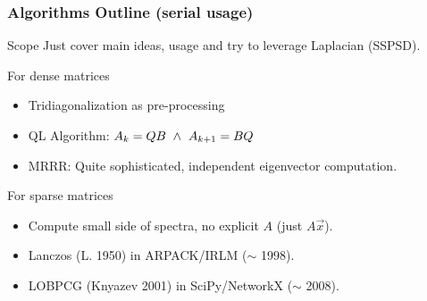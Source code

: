  \begin{frame}
  \frametitle{Algorithms Outline (serial usage)}
  \begin{block}{Scope}
    Just cover main ideas, usage and try to leverage Laplacian (SSPSD).
  \end{block}
  \begin{block}{For dense matrices}
    \begin{itemize}
      \item Tridiagonalization as pre-processing
      \item QL Algorithm: $A_k = QB \,\,\land\,\, A_{k+1} = B Q$
      \item MRRR: Quite sophisticated, independent eigenvector computation.
    \end{itemize}
  \end{block}
  \begin{block}{For sparse matrices}
    \begin{itemize}
      \item Compute small side of spectra, no explicit $A$ (just $A\vec{x}$).
    \item Lanczos (L. 1950) in ARPACK/IRLM ($\sim$ 1998).
    \item LOBPCG (Knyazev 2001) in SciPy/NetworkX ($\sim$ 2008).
    \end{itemize}
  \end{block}
\end{frame}

